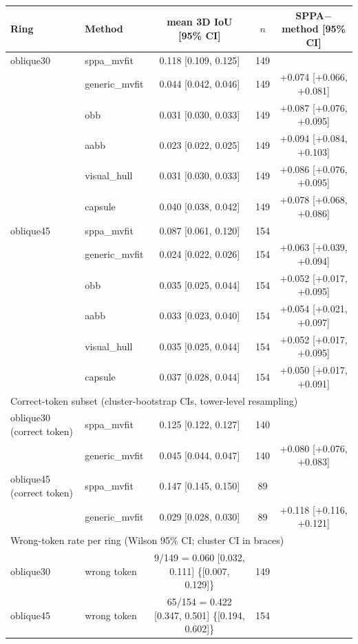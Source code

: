 \begin{tabular}{llccc}
\toprule
Ring & Method & mean 3D IoU [95\% CI] & $n$ & SPPA$-$method [95\% CI] \\
\midrule
oblique30 & sppa\_mvfit & 0.118 [0.109, 0.125] & 149 &  \\
 & generic\_mvfit & 0.044 [0.042, 0.046] & 149 & +0.074 [+0.066, +0.081] \\
 & obb & 0.031 [0.030, 0.033] & 149 & +0.087 [+0.076, +0.095] \\
 & aabb & 0.023 [0.022, 0.025] & 149 & +0.094 [+0.084, +0.103] \\
 & visual\_hull & 0.031 [0.030, 0.033] & 149 & +0.086 [+0.076, +0.095] \\
 & capsule & 0.040 [0.038, 0.042] & 149 & +0.078 [+0.068, +0.086] \\
\midrule
oblique45 & sppa\_mvfit & 0.087 [0.061, 0.120] & 154 &  \\
 & generic\_mvfit & 0.024 [0.022, 0.026] & 154 & +0.063 [+0.039, +0.094] \\
 & obb & 0.035 [0.025, 0.044] & 154 & +0.052 [+0.017, +0.095] \\
 & aabb & 0.033 [0.023, 0.040] & 154 & +0.054 [+0.021, +0.097] \\
 & visual\_hull & 0.035 [0.025, 0.044] & 154 & +0.052 [+0.017, +0.095] \\
 & capsule & 0.037 [0.028, 0.044] & 154 & +0.050 [+0.017, +0.091] \\
\midrule
\multicolumn{5}{l}{Correct-token subset (cluster-bootstrap CIs, tower-level resampling)} \\
\midrule
oblique30 (correct token) & sppa\_mvfit & 0.125 [0.122, 0.127] & 140 &  \\
 & generic\_mvfit & 0.045 [0.044, 0.047] & 140 & +0.080 [+0.076, +0.083] \\
oblique45 (correct token) & sppa\_mvfit & 0.147 [0.145, 0.150] & 89 &  \\
 & generic\_mvfit & 0.029 [0.028, 0.030] & 89 & +0.118 [+0.116, +0.121] \\
\midrule
\multicolumn{5}{l}{Wrong-token rate per ring (Wilson 95\% CI; cluster CI in braces)} \\
\midrule
oblique30 & wrong token & 9/149 = 0.060 [0.032, 0.111] \{[0.007, 0.129]\} & 149 &  \\
oblique45 & wrong token & 65/154 = 0.422 [0.347, 0.501] \{[0.194, 0.602]\} & 154 &  \\
\bottomrule
\end{tabular}
